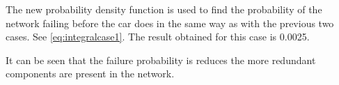 The new probability density function is used to find the probability of the network failing before the car does in the same way as with the previous two cases. See \autoref{eq:integralcase1}. The result obtained for this case is 0.0025. 

It can be seen that the failure probability is reduces the more redundant components are present in the network.